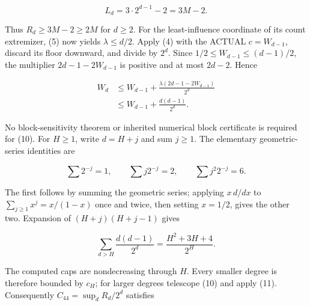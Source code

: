 \documentclass[11pt]{article}
\theoremstyle{remark}
\theoremstyle{correctionstyle}
\begin{document}
\begin{equation}
L_d=3\cdot2^{d-1}-2=3M-2.\tag*{}
\label{src-p073}
\end{equation}

\leavevmode\label{src-p074}Thus $R_d\ge3M-2\ge2M$ for $d\ge2$. For the least-influence coordinate of its
count extremizer, (5) now yields $\lambda\le d/2$. Apply (4) with the ACTUAL
$c=W_{d-1}$, discard its floor downward, and divide by $2^d$. Since
$1/2\le W_{d-1}\le(d-1)/2$, the multiplier $2d-1-2W_{d-1}$ is positive and at
most $2d-2$. Hence\label{src-end-p074}\par

\begin{equation}
\begin{aligned}W_d&\le W_{d-1}+\frac{\lambda(2d-1-2W_{d-1})}{2^d}\\
&\le W_{d-1}+\frac{d(d-1)}{2^d}.\end{aligned}\tag{10}
\label{src-p075}
\end{equation}

\leavevmode\label{src-p076}No block-sensitivity theorem or inherited numerical block certificate is
required for (10). For $H\ge1$, write $d=H+j$ and sum $j\ge1$. The elementary
geometric-series identities are\label{src-end-p076}\par

\begin{equation}
\sum 2^{-j}=1,\qquad\sum j2^{-j}=2,\qquad\sum j^2 2^{-j}=6.\tag*{}
\label{src-p077}
\end{equation}

\leavevmode\label{src-p078}The first follows by summing the geometric series; applying $x\,d/dx$ to
$\sum_{j\ge1}x^j=x/(1-x)$ once and twice, then setting $x=1/2$, gives the
other two. Expansion of $(H+j)(H+j-1)$ gives\label{src-end-p078}\par

\begin{equation}
\sum_{d>H}\frac{d(d-1)}{2^d}=\frac{H^2+3H+4}{2^H}.\tag{11}
\label{src-p079}
\end{equation}

\leavevmode\label{src-p080}The computed caps are nondecreasing through $H$. Every smaller degree is
therefore bounded by $c_H$; for larger degrees telescope (10) and apply
(11). Consequently $C_{44}=\sup_d R_d/2^d$ satisfies\label{src-end-p080}\par
\end{document}
